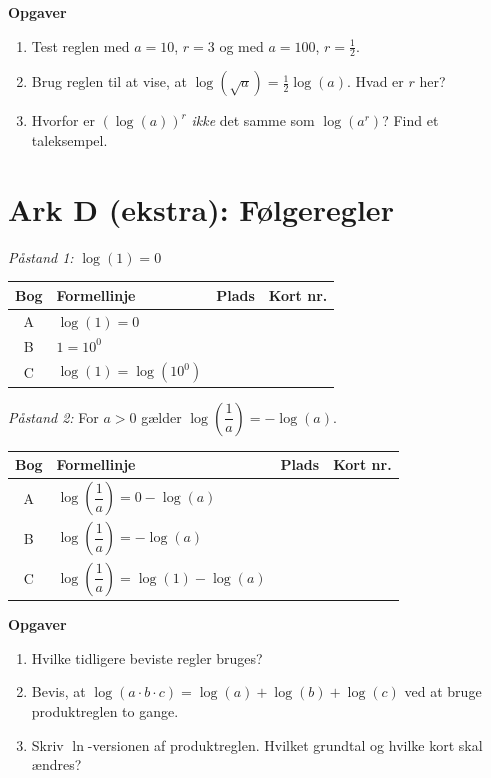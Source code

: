 \documentclass[a4paper,11pt]{article}
\begin{document}
\textbf{Opgaver}
\begin{enumerate}
\item Test reglen med \(a=10\), \(r=3\) og med \(a=100\), \(r=\frac12\).
\item Brug reglen til at vise, at \(\log(\sqrt a)=\frac12\log(a)\). Hvad er \(r\) her?
\item Hvorfor er \((\log(a))^r\) \emph{ikke} det samme som \(\log(a^r)\)? Find et taleksempel.
\end{enumerate}

\newpage
\section*{Ark D (ekstra): Følgeregler}
\label{sec:orgf3ccabc}

\emph{Påstand 1:} \(\log(1)=0\)

\begin{center}
\begin{tabular}{|c|l|c|p{2.5cm}|}
\hline
Bog & Formellinje & Plads & Kort nr.\\
\hline
A & \(\log(1)=0\) &  & \\
B & \(1=10^0\) &  & \\
C & \(\log(1)=\log(10^0)\) &  & \\
\hline
\end{tabular}
\end{center}

\emph{Påstand 2:} For \(a>0\) gælder \(\log\left(\dfrac1a\right)=-\log(a)\).

\begin{center}
\begin{tabular}{|c|l|c|p{2.5cm}|}
\hline
Bog & Formellinje & Plads & Kort nr.\\
\hline
A & \(\log\left(\dfrac1a\right)=0-\log(a)\) &  & \\
B & \(\log\left(\dfrac1a\right)=-\log(a)\) &  & \\
C & \(\log\left(\dfrac1a\right)=\log(1)-\log(a)\) &  & \\
\hline
\end{tabular}
\end{center}

\textbf{Opgaver}
\begin{enumerate}
\item Hvilke tidligere beviste regler bruges?
\item Bevis, at \(\log(a\cdot b\cdot c)=\log(a)+\log(b)+\log(c)\) ved at bruge produktreglen to gange.
\item Skriv \(\ln\)-versionen af produktreglen. Hvilket grundtal og hvilke kort skal ændres?
\end{enumerate}
\end{document}
